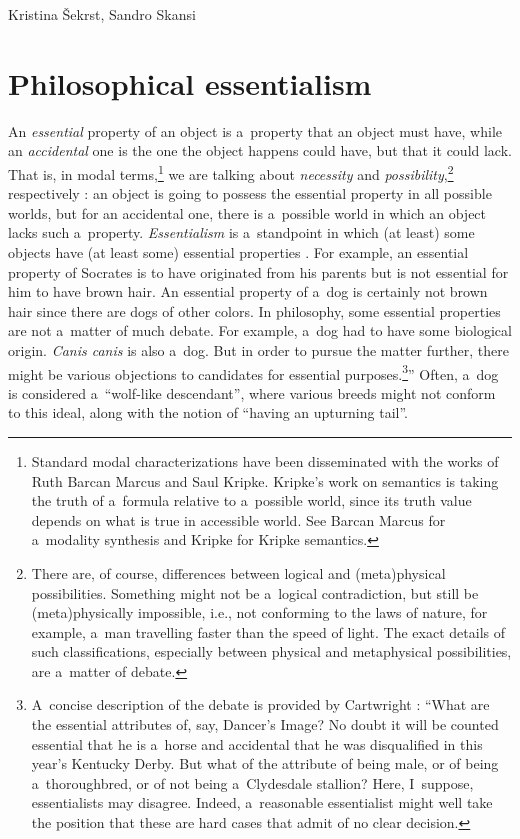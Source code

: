\begin{artengenv2auth}{Kristina Šekrst, Sandro Skansi}
\section*{Philosophical essentialism}
An \textit{essential} property of an object is a~property that an object must have, while an \textit{accidental} one is the one the object happens could have, but that it could lack. That is, in modal terms,\footnote{Standard modal characterizations have been disseminated with the works of Ruth Barcan Marcus and Saul Kripke. Kripke's work on semantics is taking the truth of a~formula relative to a~possible world, since its truth value depends on what is true in accessible world. See Barcan Marcus
\parencite*[][]{marcus_modalities_1993} %
 for a~modality synthesis and Kripke 
\parencite*[][]{kripke_naming_1972} %
 for Kripke semantics.} we are talking about \textit{necessity} and \textit{possibility},\footnote{There are, of course, differences between logical and (meta)physical possibilities. Something might not be a~logical contradiction, but still be (meta)physically impossible, i.e., not conforming to the laws of nature, for example, a~man travelling faster than the speed of light. The exact details of such classifications, especially between physical and metaphysical possibilities, are a~matter of debate.} respectively 
\parencite[][]{robertson_ishii_essential_2020}: %
 an object is going to possess the essential property in all possible worlds, but for an accidental one, there is a~possible world in which an object lacks such a~property. \textit{Essentialism} is a~standpoint in which (at least) some objects have (at least some) essential properties 
\parencite[][]{robertson_ishii_essential_2020}. %
 For example, an essential property of Socrates is to have originated from his parents but is not essential for him to have brown hair. An essential property of a~dog is certainly not brown hair since there are dogs of other colors. In philosophy, some essential properties are not a~matter of much debate. For example, a~dog had to have some biological origin. \textit{Canis canis} is also a~dog. But in order to pursue the matter further, there might be various objections to candidates for essential purposes.\footnote{A~concise description of the debate is provided by Cartwright 
\parencite*[][p.615]{cartwright_remarks_1968}: %
 ``What are the essential attributes of, say, Dancer's Image? No doubt it will be counted essential that he is a~horse and accidental that he was disqualified in this year's Kentucky Derby. But what of the attribute of being male, or of being a~thoroughbred, or of not being a~Clydesdale stallion? Here, I~suppose, essentialists may disagree. Indeed, a~reasonable essentialist might well take the position that these are hard cases that admit of no clear decision.}'' Often, a~dog is considered a~``wolf-like descendant'', where various breeds might not conform to this ideal, along with the notion of ``having an upturning tail''.


\end{artengenv2auth}
